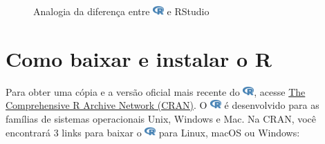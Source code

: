 \documentclass[
  letterpaper,
]{book}
\theoremstyle{definition}
\theoremstyle{plain}
\theoremstyle{remark}
\begin{document}
\begin{figure}
\begin{minipage}{0.49\linewidth}
{}


\end{minipage}%

\caption{\label{fig-r-vs-rstudio-ide-1}Analogia da diferença entre
\includegraphics[width=1.13em,height=1em]{getting_started_with_r_files/figure-pdf/fa-icon-9b00320707d42527dde67262afb33ded.pdf}
e RStudio}

\end{figure}%

\section{Como baixar e instalar o R}\label{como-baixar-e-instalar-o-r}

Para obter uma cópia e a versão oficial mais recente do
\includegraphics[width=1.13em,height=1em]{getting_started_with_r_files/figure-pdf/fa-icon-9b00320707d42527dde67262afb33ded.pdf},
acesse \href{https://cran.r-project.org/}{The Comprehensive R Archive
Network (CRAN)}. O
\includegraphics[width=1.13em,height=1em]{getting_started_with_r_files/figure-pdf/fa-icon-9b00320707d42527dde67262afb33ded.pdf}
é desenvolvido para as famílias de sistemas operacionais Unix, Windows e
Mac. Na CRAN, você encontrará 3 links para baixar o
\includegraphics[width=1.13em,height=1em]{getting_started_with_r_files/figure-pdf/fa-icon-9b00320707d42527dde67262afb33ded.pdf}
para Linux, macOS ou Windows:
\end{document}
